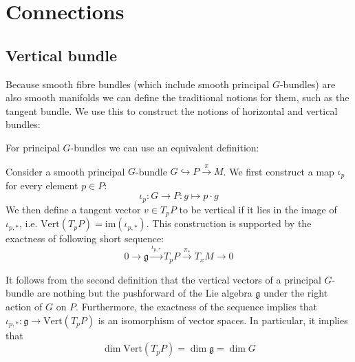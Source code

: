 \section{Connections}
\subsection{Vertical bundle}
	
	Because smooth fibre bundles (which include smooth principal $G$-bundles) are also smooth manifolds we can define the traditional notions for them, such as the tangent bundle. We use this to construct the notions of horizontal and vertical bundles:

	For principal $G$-bundles we can use an equivalent definition:
	\begin{adefinition}
		Consider a smooth principal $G$-bundle $G\hookrightarrow P\xrightarrow{\pi} M$. We first construct a map $\iota_p$ for every element $p\in P$:
		\begin{equation}
			\iota_p:G\rightarrow P: g\mapsto p\cdot g
		\end{equation}
		We then define a tangent vector $v\in T_p P$ to be vertical if it lies in the image of $\iota_{p,\ast}$, i.e. $\text{Vert}(T_pP) = \text{im}(\iota_{p,\ast})$. This construction is supported by the exactness of following short sequence:
		\begin{equation}
			0\xrightarrow{} \mathfrak{g} \xrightarrow{\iota_{p,\ast}} T_p P\xrightarrow{\pi_\ast} T_xM \xrightarrow{} 0
		\end{equation}
	\end{adefinition}
	
	\begin{property}[Dimension]
		It follows from the second definition that the vertical vectors of a principal $G$-bundle are nothing but the pushforward of the Lie algebra $\mathfrak{g}$ under the right action of $G$ on $P$. Furthermore, the exactness of the sequence implies that $\iota_{p,\ast}:\mathfrak{g}\rightarrow\text{Vert}(T_pP)$ is an isomorphism of vector spaces. In particular, it implies that
		\begin{equation}
			\label{manifolds:vertical_dimension}
			\dim\text{Vert}(T_pP) = \dim\mathfrak{g} = \dim G
		\end{equation}
	\end{property}
	
